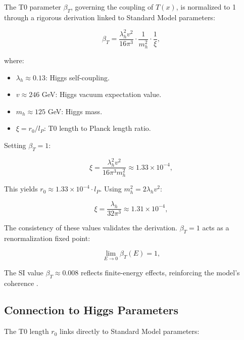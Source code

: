 \documentclass[twocolumn,aps,prl]{revtex4-2}
\begin{document}
	The T0 parameter $\beta_T$, governing the coupling of $T(x)$, is normalized to 1 through a rigorous derivation linked to Standard Model parameters:
	
	\begin{equation}
		\beta_T = \frac{\lambda_h^2 v^2}{16 \pi^3} \cdot \frac{1}{m_h^2} \cdot \frac{1}{\xi}, \label{eq:beta_derivation}
	\end{equation}
	
	where:
	\begin{itemize}
		\item $\lambda_h \approx 0.13$: Higgs self-coupling.
		\item $v \approx 246$ GeV: Higgs vacuum expectation value.
		\item $m_h \approx 125$ GeV: Higgs mass.
		\item $\xi = r_0/l_P$: T0 length to Planck length ratio.
	\end{itemize}
	
	Setting $\beta_T = 1$:
	
	\begin{equation}
		\xi = \frac{\lambda_h^2 v^2}{16 \pi^3 m_h^2} \approx 1.33 \times 10^{-4}, \label{eq:xi_value}
	\end{equation}
	
	This yields $r_0 \approx 1.33 \times 10^{-4} \cdot l_P$. Using $m_h^2 = 2 \lambda_h v^2$:
	
	\begin{equation}
		\xi = \frac{\lambda_h}{32 \pi^3} \approx 1.31 \times 10^{-4}, \label{eq:xi_alt}
	\end{equation}
	
	The consistency of these values validates the derivation. $\beta_T = 1$ acts as a renormalization fixed point:
	
	\begin{equation}
		\lim_{E \to 0} \beta_T(E) = 1, \label{eq:beta_limit}
	\end{equation}
	
	The SI value $\beta_T \approx 0.008$ reflects finite-energy effects, reinforcing the model’s coherence \cite{pascher_beta_2025}.
	
	\subsection{Connection to Higgs Parameters}
	\label{subsec:higgs}
	
	The T0 length $r_0$ links directly to Standard Model parameters:
	
\end{document}
